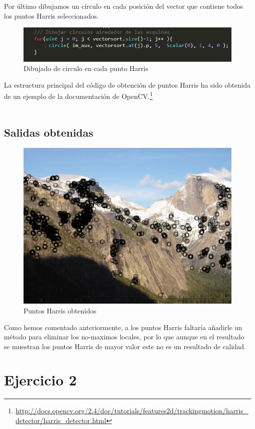 Por último dibujamos un círculo en cada posición del vector que contiene todos los puntos Harris seleccionados.

\begin{figure}[H]
\centering
\includegraphics[width=0.7\linewidth]{dibujar_circulos}
\caption{Dibujado de circulo en cada punto Harris}
\label{fig:dibujarcirculos}
\end{figure}

La estructura principal del código de obtención de puntos Harris ha sido obtenida de un ejemplo de la documentación de OpenCV.\footnote{\url{http://docs.opencv.org/2.4/doc/tutorials/features2d/trackingmotion/harris_detector/harris_detector.html}}\\
\\
\subsection{Salidas obtenidas}

\begin{figure}[H]
\centering
\includegraphics[width=0.7\linewidth]{Salida_ej1}
\caption{Puntos Harris obtenidos}
\label{fig:salidaej1}
\end{figure}

Como hemos comentado anteriormente, a los puntos Harris faltaría añadirle un método para eliminar los no-maximos locales, por lo que aunque en el resultado se muestran los puntos Harris de mayor valor este no es un resultado de calidad.

\newpage
\section{Ejercicio 2}

